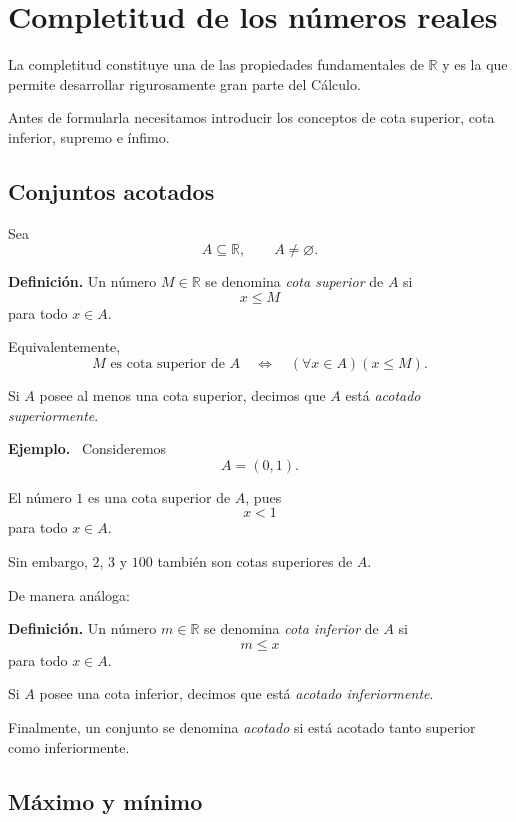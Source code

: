 \documentclass[12pt]{article}
\newenvironment{Ejem}
{\par\medskip\noindent\textbf{Ejemplo.}\ }
{\par\medskip}
\begin{document}
{%
\section{Completitud de los números reales}

La completitud constituye una de las propiedades fundamentales de
$\mathbb{R}$ y es la que permite desarrollar rigurosamente gran parte del
Cálculo.

Antes de formularla necesitamos introducir los conceptos de cota superior,
cota inferior, supremo e ínfimo.

\subsection{Conjuntos acotados}

Sea
\[
A\subseteq\mathbb{R},
\qquad A\neq\varnothing.
\]

\textbf{Definición.}
Un número $M\in\mathbb{R}$ se denomina \emph{cota superior} de $A$ si
\[
x\leq M
\]
para todo $x\in A$.

Equivalentemente,
\[
M\text{ es cota superior de }A
\quad\Longleftrightarrow\quad
(\forall x\in A)(x\leq M).
\]

Si $A$ posee al menos una cota superior, decimos que $A$ está
\emph{acotado superiormente}.

\begin{Ejem}
Consideremos
\[
A=(0,1).
\]

El número $1$ es una cota superior de $A$, pues
\[
x<1
\]
para todo $x\in A$.

Sin embargo, $2$, $3$ y $100$ también son cotas superiores de $A$.
\end{Ejem}

De manera análoga:

\textbf{Definición.}
Un número $m\in\mathbb{R}$ se denomina \emph{cota inferior} de $A$ si
\[
m\leq x
\]
para todo $x\in A$.

Si $A$ posee una cota inferior, decimos que está
\emph{acotado inferiormente}.

Finalmente, un conjunto se denomina \emph{acotado} si está acotado tanto
superior como inferiormente.

\subsection{Máximo y mínimo}

}
\end{document}
